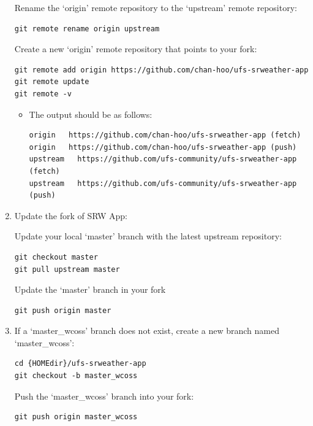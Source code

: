 \documentclass[11pt,fleqn]{report}              %
\begin{document}
\begin{enumerate}
Rename the `origin' remote repository to the `upstream' remote repository:
\lstset{language=bash}   
\begin{lstlisting}[frame=trBL]
git remote rename origin upstream
\end{lstlisting}

Create a new `origin' remote repository that points to your fork:
\lstset{language=bash}   
\begin{lstlisting}[frame=trBL]
git remote add origin https://github.com/chan-hoo/ufs-srweather-app
git remote update
git remote -v
\end{lstlisting}

\begin{itemize}
\item The output should be as follows:
\lstset{language=bash}   
\begin{lstlisting}[frame=trBL]
origin   https://github.com/chan-hoo/ufs-srweather-app (fetch)
origin   https://github.com/chan-hoo/ufs-srweather-app (push)
upstream   https://github.com/ufs-community/ufs-srweather-app (fetch)
upstream   https://github.com/ufs-community/ufs-srweather-app (push)
\end{lstlisting}
\end{itemize}


\item Update the fork of SRW App:

Update your local `master' branch with the latest upstream repository:
\lstset{language=bash}   
\begin{lstlisting}[frame=trBL]
git checkout master
git pull upstream master 
\end{lstlisting}

Update the `master' branch in your fork
\lstset{language=bash}   
\begin{lstlisting}[frame=trBL]
git push origin master
\end{lstlisting}


\item If a `master\_wcoss' branch does not exist, create a new branch named `master\_wcoss':
\lstset{language=bash}   
\begin{lstlisting}[frame=trBL]
cd {HOMEdir}/ufs-srweather-app
git checkout -b master_wcoss
\end{lstlisting}

Push the `master\_wcoss' branch into your fork:
\lstset{language=bash}   
\begin{lstlisting}[frame=trBL]
git push origin master_wcoss
\end{lstlisting}



\end{enumerate}
\end{document}
